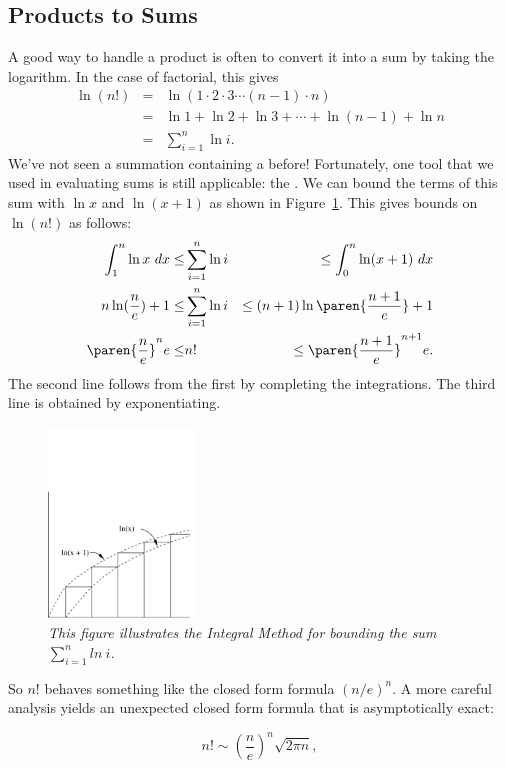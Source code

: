 \subsection{Products to Sums}

A good way to handle a product is often to convert it into a sum by taking
the logarithm.  In the case of factorial, this gives
\begin{eqnarray*}
\ln (n!) 
       & = & \ln(1 \cdot 2 \cdot 3 \cdots (n-1) \cdot n) \\
       & = & \ln 1 + \ln 2 + \ln 3 + \cdots + \ln(n-1) + \ln n \\
       & = & \sum_{i=1}^n \ln i.
\end{eqnarray*}
We've not seen a summation containing a  before!
Fortunately, one tool that we used in evaluating sums is still applicable:
the .  We can bound the terms of this sum with $\ln
x$ and $\ln(x+1)$ as shown in Figure~\ref{fig:integral2}.  This gives
bounds on $\ln(n!)$ as follows:
\begin{eqnarray*}
\int_1^n \ln x \ dx \leq & \sum_{i=1}^n \ln i & \leq \int_0^n \ln(x+1) \ dx \\
n \ln(\frac{n}{e}) + 1 \leq & \sum_{i=1}^n \ln i & \leq (n+1) \ln\paren{\frac{n+1}{e}} + 1 \\
\paren{\frac{n}{e}}^n e \leq & n! & \leq  \paren{\frac{n+1}{e}}^{n+1} e.
\end{eqnarray*}
The second line follows from the first by completing the integrations.
The third line is obtained by exponentiating.

\begin{figure}[htbp]
\centerline{%
\includegraphics[height=2in]{figures/integral2}
}
\caption{\em This figure illustrates the Integral Method for bounding
the sum $\sum_{i=1}^n ln \ i$.}
\label{fig:integral2}
\end{figure}

So $n!$ behaves something like the closed form formula $(n/e)^n$.
A more careful analysis yields an unexpected closed form formula that is
asymptotically exact:
\begin{lemma*}
\begin{equation}\label{nfacsim}
n! \sim \left(\frac{n}{e}\right)^n \sqrt{2 \pi n},
\end{equation}
\end{lemma*}

